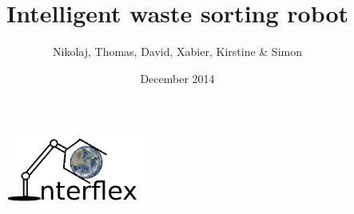 \begin{titlepage}


\title{Intelligent waste sorting robot}
\author{Nikolaj, Thomas, David, Xabier, Kirstine \& Simon }
\date{December 2014}

\begin{figure}[b]
\centering
\includegraphics[width=0.4\textwidth]{graphics/logo}
\end{figure}

\vfill
\end{titlepage}
\maketitle
